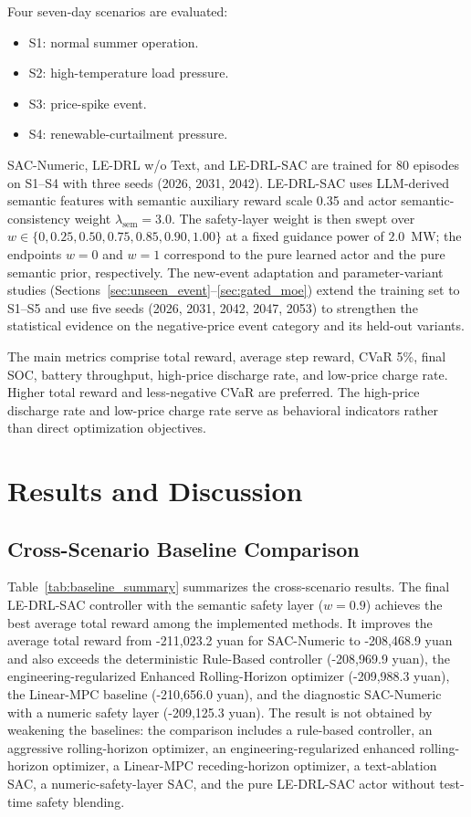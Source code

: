 \documentclass{ieeeaccess}
\begin{document}
Four seven-day scenarios are evaluated:
\begin{itemize}
  \item S1: normal summer operation.
  \item S2: high-temperature load pressure.
  \item S3: price-spike event.
  \item S4: renewable-curtailment pressure.
\end{itemize}

SAC-Numeric, LE-DRL w/o Text, and LE-DRL-SAC are trained for 80 episodes on S1--S4 with three seeds (2026, 2031, 2042). LE-DRL-SAC uses LLM-derived semantic features with semantic auxiliary reward scale 0.35 and actor semantic-consistency weight $\lambda_{\mathrm{sem}}=3.0$. The safety-layer weight is then swept over $w \in \{0,0.25,0.50,0.75,0.85,0.90,1.00\}$ at a fixed guidance power of $2.0$~MW; the endpoints $w=0$ and $w=1$ correspond to the pure learned actor and the pure semantic prior, respectively. The new-event adaptation and parameter-variant studies (Sections~\ref{sec:unseen_event}--\ref{sec:gated_moe}) extend the training set to S1--S5 and use five seeds (2026, 2031, 2042, 2047, 2053) to strengthen the statistical evidence on the negative-price event category and its held-out variants.

The main metrics comprise total reward, average step reward, CVaR 5\%, final SOC, battery throughput, high-price discharge rate, and low-price charge rate. Higher total reward and less-negative CVaR are preferred. The high-price discharge rate and low-price charge rate serve as behavioral indicators rather than direct optimization objectives.

\section{Results and Discussion}
\label{sec:results}

\subsection{Cross-Scenario Baseline Comparison}
Table~\ref{tab:baseline_summary} summarizes the cross-scenario results. The final LE-DRL-SAC controller with the semantic safety layer ($w=0.9$) achieves the best average total reward among the implemented methods. It improves the average total reward from -211,023.2 yuan for SAC-Numeric to -208,468.9 yuan and also exceeds the deterministic Rule-Based controller (-208,969.9 yuan), the engineering-regularized Enhanced Rolling-Horizon optimizer (-209,988.3 yuan), the Linear-MPC baseline (-210,656.0 yuan), and the diagnostic SAC-Numeric with a numeric safety layer (-209,125.3 yuan). The result is not obtained by weakening the baselines: the comparison includes a rule-based controller, an aggressive rolling-horizon optimizer, an engineering-regularized enhanced rolling-horizon optimizer, a Linear-MPC receding-horizon optimizer, a text-ablation SAC, a numeric-safety-layer SAC, and the pure LE-DRL-SAC actor without test-time safety blending.
\end{document}
